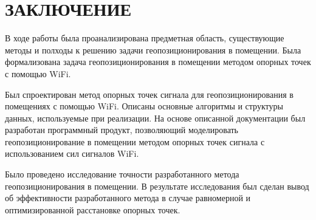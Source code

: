 \chapter*{ЗАКЛЮЧЕНИЕ}

В ходе работы была проанализирована предметная область, существующие методы и полходы к решению задачи геопозиционирования в помещении. Была формализована задача геопозиционирования в помещении методом опорных точек с помощью WiFi.

Был спроектирован метод опорных точек сигнала для геопозиционирования в помещениях с помощью WiFi. Описаны основные алгоритмы и структуры данных, используемые при реализации. На основе описанной документации был разработан программный продукт, позволяющий моделировать геопозиционирование в помещении методом опорных точек сигнала с использованием сил сигналов WiFi.

Было проведено исследование точности разработанного метода геопозиционирования в помещении. В результате исследования был сделан вывод об эффективности разработанного метода в случае равномерной и оптимизированной расстановке опорных точек.
